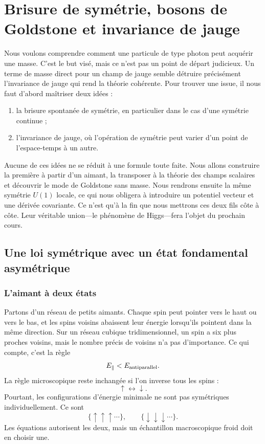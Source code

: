 \chapter{Brisure de symétrie, bosons de Goldstone et invariance de jauge}

Nous voulons comprendre comment une particule de type photon peut acquérir une masse. C’est le but visé, mais ce n’est pas un point de départ judicieux. Un terme de masse direct pour un champ de jauge semble détruire précisément l’invariance de jauge qui rend la théorie cohérente. Pour trouver une issue, il nous faut d’abord maîtriser deux idées :
\begin{enumerate}
  \item la brisure spontanée de symétrie, en particulier dans le cas d’une symétrie continue ;
  \item l’invariance de jauge, où l’opération de symétrie peut varier d’un point de l’espace-temps à un autre.
\end{enumerate}
Aucune de ces idées ne se réduit à une formule toute faite. Nous allons construire la première à partir d’un aimant, la transposer à la théorie des champs scalaires et découvrir le mode de Goldstone sans masse. Nous rendrons ensuite la même symétrie \(U(1)\) locale, ce qui nous obligera à introduire un potentiel vecteur et une dérivée covariante. Ce n’est qu’à la fin que nous mettrons ces deux fils côte à côte. Leur véritable union---le phénomène de Higgs---fera l’objet du prochain cours.

\section{Une loi symétrique avec un état fondamental asymétrique}

\subsection{L’aimant à deux états}

Partons d’un réseau de petits aimants. Chaque spin peut pointer vers le haut ou vers le bas, et les spins voisins abaissent leur énergie lorsqu’ils pointent dans la même direction. Sur un réseau cubique tridimensionnel, un spin a six plus proches voisins, mais le nombre précis de voisins n’a pas d’importance. Ce qui compte, c’est la règle
\begin{equation}
  E_{\parallel}<E_{\rm antiparallel}.
\end{equation}
La règle microscopique reste inchangée si l’on inverse tous les spins :
\begin{equation}
  \uparrow\longleftrightarrow\downarrow.
\end{equation}
Pourtant, les configurations d’énergie minimale ne sont pas symétriques individuellement. Ce sont
\begin{equation}
  \{\uparrow\uparrow\uparrow\cdots\},
  \qquad
  \{\downarrow\downarrow\downarrow\cdots\}.
\end{equation}
Les équations autorisent les deux, mais un échantillon macroscopique froid doit en choisir une.

